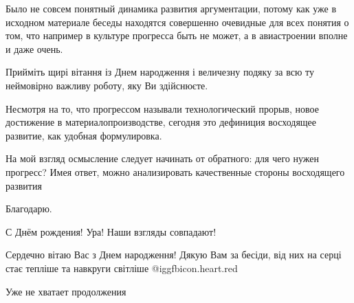 \begin{itemize}
Было не совсем понятный динамика развития аргументации, потому как уже в
исходном материале беседы находятся совершенно очевидные для всех понятия о
том, что например в культуре прогресса быть не может, а в авиастроении вполне и
даже очень.


Прийміть щирі вітання із Днем народження і величезну подяку за всю ту
неймовірно важливу роботу, яку Ви здійснюєте.


Несмотря на то, что прогрессом называли технологический прорыв, новое
достижение в материалопроизводстве, сегодня это дефиниция восходящее развитие,
как удобная формулировка.

На мой взгляд осмысление следует начинать от обратного: для чего нужен
прогресс? Имея ответ, можно анализировать качественные стороны восходящего
развития

Благодарю.

С Днём рождения! Ура! Наши взгляды совпадают!

Сердечно вітаю Вас з Днем народження! Дякую Вам за бесіди, від них на серці стає тепліше та навкруги світліше 
@igg{fbicon.heart.red}

Уже не хватает продолжения

\end{itemize} %
